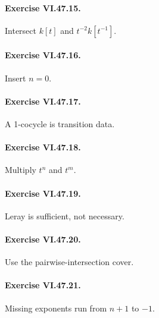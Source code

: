 \paragraph{Exercise VI.47.15.}
\begin{hint}
Intersect \(k[t]\) and \(t^{-2}k[t^{-1}]\).
\end{hint}

\paragraph{Exercise VI.47.16.}
\begin{hint}
Insert \(n=0\).
\end{hint}

\paragraph{Exercise VI.47.17.}
\begin{hint}
A 1-cocycle is transition data.
\end{hint}

\paragraph{Exercise VI.47.18.}
\begin{hint}
Multiply \(t^n\) and \(t^m\).
\end{hint}

\paragraph{Exercise VI.47.19.}
\begin{hint}
Leray is sufficient, not necessary.
\end{hint}

\paragraph{Exercise VI.47.20.}
\begin{hint}
Use the pairwise-intersection cover.
\end{hint}

\paragraph{Exercise VI.47.21.}
\begin{hint}
Missing exponents run from \(n+1\) to \(-1\).
\end{hint}

